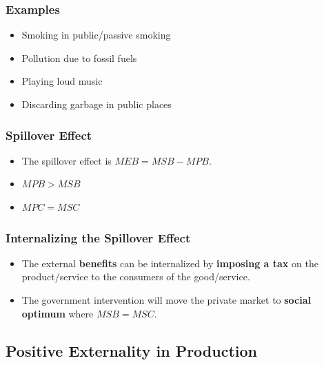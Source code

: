 \documentclass[
  letterpaper,
  DIV=11,
  numbers=noendperiod]{scrartcl}
\providecommand{\tightlist}{%
  \setlength{\itemsep}{0pt}\setlength{\parskip}{0pt}}\usepackage{longtable,booktabs,array}
\begin{document}
\subsubsection{Examples}\label{examples-3}

\begin{itemize}
\tightlist
\item
  Smoking in public/passive smoking
\item
  Pollution due to fossil fuels
\item
  Playing loud music
\item
  Discarding garbage in public places
\end{itemize}

\subsubsection{Spillover Effect}\label{spillover-effect-1}

\begin{itemize}
\tightlist
\item
  The spillover effect is \(MEB = MSB-MPB\).
\item
  \(MPB > MSB\)
\item
  \(MPC = MSC\)
\end{itemize}

\subsubsection{Internalizing the Spillover
Effect}\label{internalizing-the-spillover-effect-1}

\begin{itemize}
\tightlist
\item
  The external \textbf{benefits} can be internalized by \textbf{imposing
  a tax} on the product/service to the consumers of the good/service.
\item
  The government intervention will move the private market to
  \textbf{social optimum} where \(MSB = MSC\).
\end{itemize}

\newpage{}

\subsection{Positive Externality in
Production}\label{positive-externality-in-production}
\end{document}
